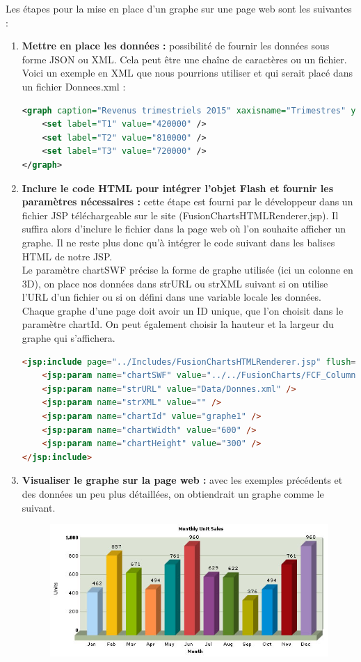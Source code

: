 Les étapes pour la mise en place d'un graphe sur une page web sont les suivantes :
\begin{enumerate}
 \item \textbf{Mettre en place les données :} possibilité de fournir les données sous forme JSON ou XML. Cela peut être une chaîne de caractères ou un fichier. Voici un exemple en XML que nous pourrions utiliser et qui serait placé dans un fichier Donnees.xml :
\begin{lstlisting}[language=XML]
<graph caption="Revenus trimestriels 2015" xaxisname="Trimestres" yaxisname="Revenus (euros)">
    <set label="T1" value="420000" />
    <set label="T2" value="810000" />
    <set label="T3" value="720000" />
</graph>
\end{lstlisting}
 \item \textbf{Inclure le code HTML pour intégrer l'objet Flash et fournir les paramètres nécessaires :} cette étape est fourni par le développeur dans un fichier JSP téléchargeable sur le site (FusionChartsHTMLRenderer.jsp). Il suffira alors d'inclure le fichier dans la page web où l'on souhaite afficher un graphe. Il ne reste plus donc qu'à intégrer le code suivant dans les balises HTML de notre JSP.\\
 Le paramètre chartSWF précise la forme de graphe utilisée (ici un colonne en 3D), on place nos données dans strURL ou strXML suivant si on utilise l'URL d'un fichier ou si on défini dans une variable locale les données.
 Chaque graphe d'une page doit avoir un ID unique, que l'on choisit dans le paramètre chartId. On peut également choisir la hauteur et la largeur du graphe qui s'affichera.
\begin{lstlisting}[language=HTML]
<jsp:include page="../Includes/FusionChartsHTMLRenderer.jsp" flush="true">
    <jsp:param name="chartSWF" value="../../FusionCharts/FCF_Column3D.swf" />
    <jsp:param name="strURL" value="Data/Donnes.xml" />
    <jsp:param name="strXML" value="" />
    <jsp:param name="chartId" value="graphe1" />
    <jsp:param name="chartWidth" value="600" />
    <jsp:param name="chartHeight" value="300" />
</jsp:include>
\end{lstlisting} 
 \item \textbf{Visualiser le graphe sur la page web :} avec les exemples précédents et des données un peu plus détaillées, on obtiendrait un graphe comme le suivant.
\begin{figure}[H]
  \center
  \includegraphics[scale=0.7]{../graph/fusionChartsExemple.jpg}

\end{figure}
\end{enumerate}
